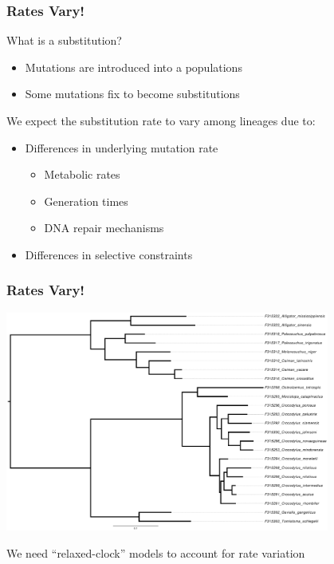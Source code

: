 \begin{frame}
    \frametitle{Rates Vary!}
    What is a substitution?
    \begin{itemize}
        \item Mutations are introduced into a populations
        \item Some mutations fix to become substitutions
    \end{itemize}
    We expect the substitution rate to vary among lineages due to:
    \begin{itemize}
        \item Differences in underlying mutation rate
        \begin{itemize}
            \item Metabolic rates
            \item Generation times
            \item DNA repair mechanisms
        \end{itemize}
        \item Differences in selective constraints
    \end{itemize}
\end{frame}

\begin{frame}
    \frametitle{Rates Vary!}
    \begin{center}
        \includegraphics[width=0.8\textwidth]{../images/crocodylia-ml-tree.pdf}
    \end{center}
    We need ``relaxed-clock'' models to account for rate variation
\end{frame}


